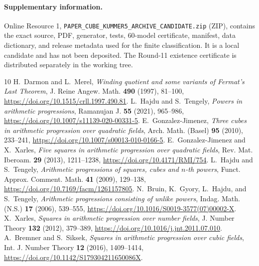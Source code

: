 \documentclass[10pt]{article}
\begin{document}
\paragraph{Supplementary information.}
Online Resource 1, \texttt{PAPER\_CUBE\_KUMMER5\_ARCHIVE\_CANDIDATE.zip}
(ZIP), contains the exact source, PDF, generator, tests, 60-model certificate,
manifest, data dictionary, and release metadata used for the finite
classification.  It is a local candidate and has not been deposited.  The
Round-11 existence certificate is distributed separately in the working tree.

\begin{thebibliography}{10}
 H.~Darmon and L.~Merel,
\emph{Winding quotient and some variants of Fermat's Last Theorem},
J. Reine Angew. Math. \textbf{490} (1997), 81--100,
\url{https://doi.org/10.1515/crll.1997.490.81}.
 L.~Hajdu and S.~Tengely,
\emph{Powers in arithmetic progressions}, Ramanujan J. \textbf{55}
(2021), 965--986, \url{https://doi.org/10.1007/s11139-020-00331-5}.
 E.~Gonzalez-Jimenez,
\emph{Three cubes in arithmetic progression over quadratic fields},
Arch. Math. (Basel) \textbf{95} (2010), 233--241,
\url{https://doi.org/10.1007/s00013-010-0166-5}.
 E.~Gonzalez-Jimenez and X.~Xarles,
\emph{Five squares in arithmetic progression over quadratic fields},
Rev. Mat. Iberoam. \textbf{29} (2013), 1211--1238,
\url{https://doi.org/10.4171/RMI/754}.
 L.~Hajdu and S.~Tengely,
\emph{Arithmetic progressions of squares, cubes and $n$-th powers},
Funct. Approx. Comment. Math. \textbf{41} (2009), 129--138,
\url{https://doi.org/10.7169/facm/1261157805}.
 N.~Bruin, K.~Gyory, L.~Hajdu, and S.~Tengely,
\emph{Arithmetic progressions consisting of unlike powers},
Indag. Math. (N.S.) \textbf{17} (2006), 539--555,
\url{https://doi.org/10.1016/S0019-3577(07)00002-X}.
 X.~Xarles,
\emph{Squares in arithmetic progression over number fields},
J. Number Theory \textbf{132} (2012), 379--389,
\url{https://doi.org/10.1016/j.jnt.2011.07.010}.
 A.~Bremner and S.~Siksek,
\emph{Squares in arithmetic progression over cubic fields},
Int. J. Number Theory \textbf{12} (2016), 1409--1414,
\url{https://doi.org/10.1142/S179304211650086X}.
\end{thebibliography}
\end{document}
